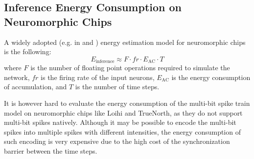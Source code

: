     \subsection{Inference Energy Consumption on Neuromorphic Chips}
    \label{subsec:inference_energy}
        A widely adopted (e.g. in \cite{zhu2024spikegptgenerativepretrainedlanguage} and \cite{chen2024deepreinforcementlearningspiking}) energy estimation model for neuromorphic chips is the following:
        \begin{equation}
            \label{eq:inference_energy_popular}
            E_{\text{inference}} \approx F \cdot fr \cdot E_{\text{AC}} \cdot T
        \end{equation}
        where $F$ is the number of floating point operations required to simulate the network, $fr$ is the firing rate of the input neurons, $E_{\text{AC}}$ is the energy consumption of accumulation, and $T$ is the number of time steps. 
    
        It is however hard to evaluate the energy consumption of the multi-bit spike train model on neuromorphic chips like Loihi and TrueNorth, as they do not support multi-bit spikes natively. Although it may be possible to encode the multi-bit spikes into multiple spikes with different intensities, the energy consumption of such encoding is very expensive due to the high cost of the synchronization barrier between the time steps. 

